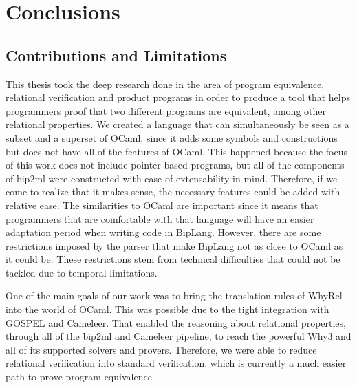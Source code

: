 
%

\chapter{Conclusions}
\label{cha:conclusion}

\section{Contributions and Limitations}
\label{sec:contributions_limitations}

This thesis took the deep research done in the area of program equivalence, relational verification and product programs in order to produce a tool that helps programmers proof that two different programs are equivalent, among other relational properties.
We created a language that can simultaneously be seen as a subset and a superset of OCaml, since it adds some symbols and constructions but does not have all of the features of OCaml.
This happened because the focus of this work does not include pointer based programs, but all of the components of bip2ml were constructed with ease of extensability in mind. 
Therefore, if we come to realize that it makes sense, the necessary features could be added with relative ease.
The similarities to OCaml are important since it means that programmers that are comfortable with that language will have an easier adaptation period when writing code in BipLang.
However, there are some restrictions imposed by the parser that make BipLang not as close to OCaml as it could be.
These restrictions stem from technical difficulties that could not be tackled due to temporal limitations.

One of the main goals of our work was to bring the translation rules of WhyRel into the world of OCaml.
This was possible due to the tight integration with GOSPEL and Cameleer.
That enabled the reasoning about relational properties, through all of the bip2ml and Cameleer pipeline, to reach the powerful Why3 and all of its supported solvers and provers.
Therefore, we were able to reduce relational verification into standard verification, which is currently a much easier path to prove program equivalence.

